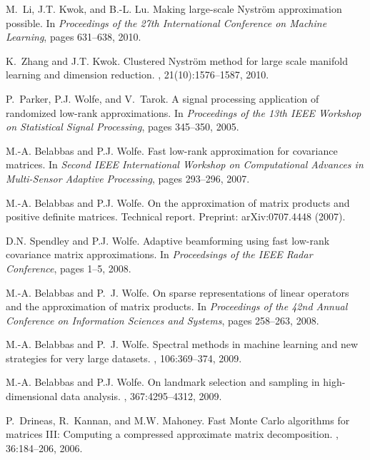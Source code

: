 \documentclass[twoside]{article}
\begin{document}
\begin{small}
\begin{thebibliography}{100}
M.~Li, J.T. Kwok, and B.-L. Lu.
\newblock Making large-scale {N}ystr\"{o}m approximation possible.
\newblock In {\em Proceedings of the 27th International Conference on Machine
  Learning}, pages 631--638, 2010.

K.~Zhang and J.T. Kwok.
\newblock Clustered {N}ystr\"{o}m method for large scale manifold learning and
  dimension reduction.
, 21(10):1576--1587, 2010.

P.~Parker, P.J. Wolfe, and V.~Tarok.
\newblock A signal processing application of randomized low-rank
  approximations.
\newblock In {\em Proceedings of the 13th IEEE Workshop on Statistical Signal
  Processing}, pages 345--350, 2005.

M.-A. Belabbas and P.J. Wolfe.
\newblock Fast low-rank approximation for covariance matrices.
\newblock In {\em Second IEEE International Workshop on Computational Advances
  in Multi-Sensor Adaptive Processing}, pages 293--296, 2007.

M.-A. Belabbas and P.J. Wolfe.
\newblock On the approximation of matrix products and positive definite
  matrices.
\newblock Technical report.
\newblock Preprint: arXiv:0707.4448 (2007).

D.N. Spendley and P.J. Wolfe.
\newblock Adaptive beamforming using fast low-rank covariance matrix
  approximations.
\newblock In {\em Proceedsings of the IEEE Radar Conference}, pages 1--5, 2008.

M.-A. Belabbas and P.~J. Wolfe.
\newblock On sparse representations of linear operators and the approximation
  of matrix products.
\newblock In {\em Proceedings of the 42nd Annual Conference on Information
  Sciences and Systems}, pages 258--263, 2008.

M.-A. Belabbas and P.~J. Wolfe.
\newblock Spectral methods in machine learning and new strategies for very
  large datasets.
, 106:369--374, 2009.

M.-A. Belabbas and P.J. Wolfe.
\newblock On landmark selection and sampling in high-dimensional data analysis.
,
  367:4295--4312, 2009.

P.~Drineas, R.~Kannan, and M.W. Mahoney.
\newblock Fast {Monte Carlo} algorithms for matrices {III}: Computing a
  compressed approximate matrix decomposition.
, 36:184--206, 2006.


\end{thebibliography}
\end{small}
\end{document}
